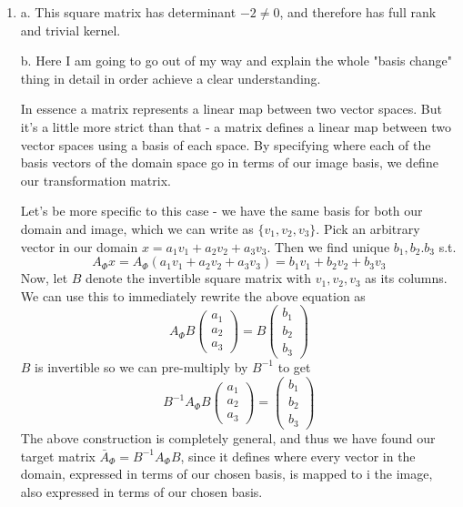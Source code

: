 \documentclass{article}
\newcommand{\chapternumber}{2}
\newenvironment{QandA}{\begin{enumerate}[label=\chapternumber.\arabic*]\bfseries\boldmath}
	{\end{enumerate}}
\newenvironment{answered}{\par\bigskip\normalfont\unboldmath}{}
\begin{document}
\begin{QandA}
		\item
		\begin{answered}
			a. This square matrix has determinant $-2\neq0$, and therefore has full rank and trivial kernel.
			
			b. Here I am going to go out of my way and explain the whole "basis change" thing in detail in order achieve a clear understanding.
			
			In essence a matrix represents a linear map between two vector spaces. But it's a little more strict than that - a matrix defines a linear map between two vector spaces using a basis of each space. By specifying where each of the basis vectors of the domain space go in terms of our image basis, we define our transformation matrix.
			
			Let's be more specific to this case - we have the same basis for both our domain and image, which we can write as $\{v_1,v_2,v_3\}$. Pick an arbitrary vector in our domain $x = a_1v_1+a_2v_2+a_3v_3$. Then we find unique $b_1,b_2.b_3$ s.t.
			\[A_\Phi x = A_\Phi(a_1v_1+a_2v_2+a_3v_3) = b_1v_1+b_2v_2+b_3v_3\]
			Now, let $B$ denote the invertible square matrix with $v_1,v_2,v_3$ as its columns. We can use this to immediately rewrite the above equation as
			\[A_\Phi B
			\begin{pmatrix}
				a_1 \\ a_2 \\ a_3
			\end{pmatrix}
			=
			B
			\begin{pmatrix}
				b_1 \\ b_2 \\ b_3
			\end{pmatrix}
			\]
			$B$ is invertible so we can pre-multiply by $B^{-1}$ to get
			\[B^{-1}A_\Phi B
			\begin{pmatrix}
				a_1 \\ a_2 \\ a_3
			\end{pmatrix}
			=
			\begin{pmatrix}
				b_1 \\ b_2 \\ b_3
			\end{pmatrix}
			\]
			The above construction is completely general, and thus we have found our target matrix $\bar{A}_\Phi = B^{-1}A_\Phi B$, since it defines where every vector in the domain, expressed in terms of our chosen basis, is mapped to i  the image, also expressed in terms of our chosen basis.
		\end{answered}
		

\end{QandA}
\end{document}
